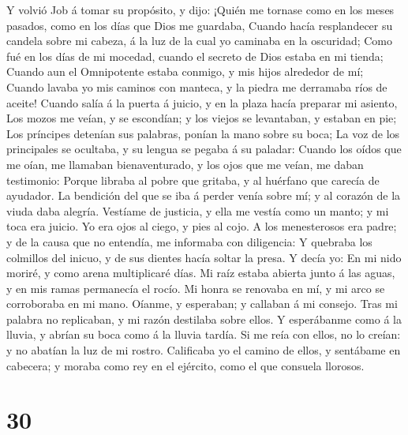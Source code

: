  Y volvió Job á tomar su propósito, y dijo: 
¡Quién me tornase como en los meses pasados, como en los días que Dios
me guardaba,  Cuando hacía resplandecer su candela sobre mi
cabeza, á la luz de la cual yo caminaba en la oscuridad; 
Como fué en los días de mi mocedad, cuando el secreto de Dios estaba en
mi tienda;  Cuando aun el Omnipotente estaba conmigo, y mis
hijos alrededor de mí;  Cuando lavaba yo mis caminos con
manteca, y la piedra me derramaba ríos de aceite!  Cuando
salía á la puerta á juicio, y en la plaza hacía preparar mi asiento,
 Los mozos me veían, y se escondían; y los viejos se
levantaban, y estaban en pie;  Los príncipes detenían sus
palabras, ponían la mano sobre su boca;  La voz de los
principales se ocultaba, y su lengua se pegaba á su paladar:
 Cuando los oídos que me oían, me llamaban bienaventurado,
y los ojos que me veían, me daban testimonio:  Porque
libraba al pobre que gritaba, y al huérfano que carecía de ayudador.
 La bendición del que se iba á perder venía sobre mí; y al
corazón de la viuda daba alegría.  Vestíame de justicia, y
ella me vestía como un manto; y mi toca era juicio.  Yo era
ojos al ciego, y pies al cojo.  A los menesterosos era
padre; y de la causa que no entendía, me informaba con diligencia:
 Y quebraba los colmillos del inicuo, y de sus dientes
hacía soltar la presa.  Y decía yo: En mi nido moriré, y
como arena multiplicaré días.  Mi raíz estaba abierta junto
á las aguas, y en mis ramas permanecía el rocío.  Mi honra
se renovaba en mí, y mi arco se corroboraba en mi mano. 
Oíanme, y esperaban; y callaban á mi consejo.  Tras mi
palabra no replicaban, y mi razón destilaba sobre ellos.  Y
esperábanme como á la lluvia, y abrían su boca como á la lluvia tardía.
 Si me reía con ellos, no lo creían: y no abatían la luz de
mi rostro.  Calificaba yo el camino de ellos, y sentábame
en cabecera; y moraba como rey en el ejército, como el que consuela
llorosos.

\hypertarget{section-29}{%
\section{30}\label{section-29}}

